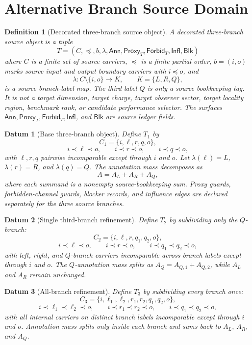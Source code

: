 \documentclass[11pt]{article}
\newcommand{\Ann}{\mathsf{Ann}}
\newcommand{\Proxy}{\mathsf{Proxy}_{T}}
\newcommand{\Forbid}{\mathsf{Forbid}_{T}}
\newcommand{\Infl}{\mathsf{Infl}}
\newtheorem{definitionblock}{Definition}
\newtheorem{datum}{Datum}
\begin{document}
\section{Alternative Branch Source Domain}

\begin{definitionblock}[Decorated three-branch source object]
A decorated three-branch source object is a tuple
\[
    T=(C,\preceq,b,\lambda,\Ann,\Proxy,\Forbid,\Infl,\mathsf{Blk})
\]
where \(C\) is a finite set of source carriers, \(\preceq\) is a finite
partial order, \(b=(i,o)\) marks source input and output boundary
carriers with \(i\preceq o\), and
\[
    \lambda:C\setminus\{i,o\}\to K,\qquad K=\{L,R,Q\},
\]
is a source branch-label map. The third label \(Q\) is only a source
bookkeeping tag. It is not a target dimension, target charge, target
observer sector, target locality region, benchmark rank, or candidate
performance selector. The surfaces \(\Ann,\Proxy,\Forbid,\Infl\), and
\(\mathsf{Blk}\) are source ledger fields.
\end{definitionblock}

\begin{datum}[Base three-branch object]
Define \(T_{1}\) by
\[
    C_{1}=\{i,\ell,r,q,o\},
\]
\[
    i\prec \ell\prec o,\qquad i\prec r\prec o,\qquad
    i\prec q\prec o,
\]
with \(\ell,r,q\) pairwise incomparable except through \(i\) and \(o\).
Let \(\lambda(\ell)=L\), \(\lambda(r)=R\), and \(\lambda(q)=Q\). The
annotation mass decomposes as
\[
    A=A_{L}+A_{R}+A_{Q},
\]
where each summand is a nonempty source-bookkeeping sum. Proxy guards,
forbidden-channel guards, blocker records, and influence edges are
declared separately for the three source branches.
\end{datum}

\begin{datum}[Single third-branch refinement]
Define \(T_{2}\) by subdividing only the \(Q\)-branch:
\[
    C_{2}=\{i,\ell,r,q_{1},q_{2},o\},
\]
\[
    i\prec \ell\prec o,\qquad i\prec r\prec o,\qquad
    i\prec q_{1}\prec q_{2}\prec o,
\]
with left, right, and \(Q\)-branch carriers incomparable across branch
labels except through \(i\) and \(o\). The \(Q\)-annotation mass splits
as \(A_{Q}=A_{Q,1}+A_{Q,2}\), while \(A_{L}\) and \(A_{R}\) remain
unchanged.
\end{datum}

\begin{datum}[All-branch refinement]
Define \(T_{3}\) by subdividing every branch once:
\[
    C_{3}=\{i,\ell_{1},\ell_{2},r_{1},r_{2},q_{1},q_{2},o\},
\]
\[
    i\prec \ell_{1}\prec \ell_{2}\prec o,\qquad
    i\prec r_{1}\prec r_{2}\prec o,\qquad
    i\prec q_{1}\prec q_{2}\prec o,
\]
with all internal carriers on distinct branch labels incomparable except
through \(i\) and \(o\). Annotation mass splits only inside each branch
and sums back to \(A_{L}\), \(A_{R}\), and \(A_{Q}\).
\end{datum}
\end{document}
